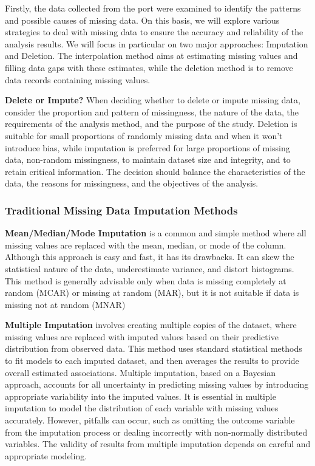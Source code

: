 \documentclass[preprint]{elsarticle}
\begin{document}
Firstly, the data collected from the port were examined to identify the patterns and possible causes of missing data. On this basis, we will explore various strategies to deal with missing data to ensure the accuracy and reliability of the analysis results. We will focus in particular on two major approaches: Imputation and Deletion. The interpolation method aims at estimating missing values and filling data gaps with these estimates, while the deletion method is to remove data records containing missing values.

\textbf{Delete or Impute?} When deciding whether to delete or impute missing data, consider the proportion and pattern of missingness, the nature of the data, the requirements of the analysis method, and the purpose of the study. Deletion is suitable for small proportions of randomly missing data and when it won't introduce bias, while imputation is preferred for large proportions of missing data, non-random missingness, to maintain dataset size and integrity, and to retain critical information. The decision should balance the characteristics of the data, the reasons for missingness, and the objectives of the analysis. \cite{Jakobsen2017}

\subsubsection{Traditional Missing Data Imputation Methods}

\textbf{Mean/Median/Mode Imputation} \cite{Kleinbort2020} is a common and simple method where all missing values are replaced with the mean, median, or mode of the column. Although this approach is easy and fast, it has its drawbacks. It can skew the statistical nature of the data, underestimate variance, and distort histograms. This method is generally advisable only when data is missing completely at random (MCAR) or missing at random (MAR), but it is not suitable if data is missing not at random (MNAR)

\textbf{Multiple Imputation} \cite{Sterneb2393} \cite{Khan2020} involves creating multiple copies of the dataset, where missing values are replaced with imputed values based on their predictive distribution from observed data. This method uses standard statistical methods to fit models to each imputed dataset, and then averages the results to provide overall estimated associations. Multiple imputation, based on a Bayesian approach, accounts for all uncertainty in predicting missing values by introducing appropriate variability into the imputed values. It is essential in multiple imputation to model the distribution of each variable with missing values accurately. However, pitfalls can occur, such as omitting the outcome variable from the imputation process or dealing incorrectly with non-normally distributed variables. The validity of results from multiple imputation depends on careful and appropriate modeling.
\end{document}
